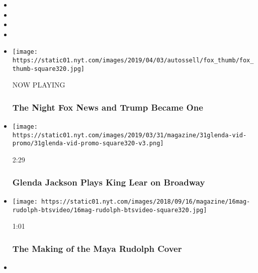 \begin{itemize}
\item
\item
\item
\item
\end{itemize}

\begin{itemize}
\item
  \texttt{[image: https://static01.nyt.com/images/2019/04/03/autossell/fox\_thumb/fox\_thumb-square320.jpg]}

  NOW PLAYING

  \hypertarget{the-night-fox-news-and-trump-became-one-2}{%
  \subsubsection{The Night Fox News and Trump Became
  One}\label{the-night-fox-news-and-trump-became-one-2}}
\item
  \href{https://www.nytimes.com/video/magazine/100000006430808/glenda-jackson-plays-king-lear-on-broadway.html?action=click\&module=video-series-bar\&region=header\&pgtype=Article\&playlistId=video/magazine}{}

  \texttt{[image: https://static01.nyt.com/images/2019/03/31/magazine/31glenda-vid-promo/31glenda-vid-promo-square320-v3.png]}

  2:29

  \hypertarget{glenda-jackson-plays-king-lear-on-broadway}{%
  \subsubsection{Glenda Jackson Plays King Lear on
  Broadway}\label{glenda-jackson-plays-king-lear-on-broadway}}
\item
  \href{https://www.nytimes.com/video/magazine/100000006104848/the-making-of-the-maya-rudolph-cover.html?action=click\&module=video-series-bar\&region=header\&pgtype=Article\&playlistId=video/magazine}{}

  \texttt{[image: https://static01.nyt.com/images/2018/09/16/magazine/16mag-rudolph-btsvideo/16mag-rudolph-btsvideo-square320.jpg]}

  1:01

  \hypertarget{the-making-of-the-maya-rudolph-cover}{%
  \subsubsection{The Making of the Maya Rudolph
  Cover}\label{the-making-of-the-maya-rudolph-cover}}
\item
  \href{https://www.nytimes.com/video/magazine/100000006065275/dev-hynes-untitled-improvisation-1.html?action=click\&module=video-series-bar\&region=header\&pgtype=Article\&playlistId=video/magazine}{}


\end{itemize}
